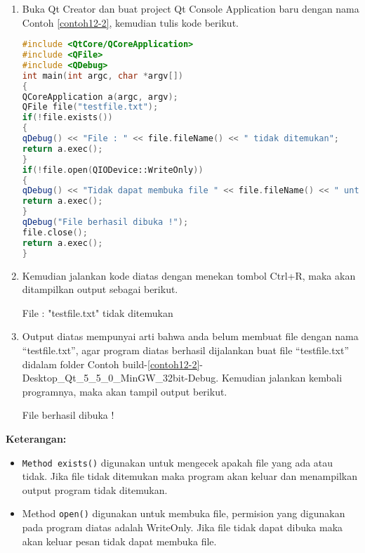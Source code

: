 \begin{enumerate}

\item
  Buka Qt Creator dan buat project Qt Console Application baru dengan
  nama Contoh \ref{contoh12-2}, kemudian tulis kode berikut.

\begin{lstlisting}[language=c++, caption=Memeriksa apakah file ada dan bisa diakses, label=contoh12-2]
#include <QtCore/QCoreApplication>
#include <QFile>
#include <QDebug>
int main(int argc, char *argv[])
{
QCoreApplication a(argc, argv);
QFile file("testfile.txt");
if(!file.exists())
{
qDebug() << "File : " << file.fileName() << " tidak ditemukan";
return a.exec();
}
if(!file.open(QIODevice::WriteOnly))
{
qDebug() << "Tidak dapat membuka file " << file.fileName() << " untuk ditulis";
return a.exec();
}
qDebug("File berhasil dibuka !");
file.close();
return a.exec();
}
\end{lstlisting}
\item
  Kemudian jalankan kode diatas dengan menekan tombol Ctrl+R, maka akan
  ditampilkan output sebagai berikut.
  
  \begin{lcverbatim}
File :  "testfile.txt"  tidak ditemukan
  \end{lcverbatim}
\item
  Output diatas mempunyai arti bahwa anda belum membuat file dengan nama
  ``testfile.txt'', agar program diatas berhasil dijalankan buat file
  ``testfile.txt'' didalam folder Contoh build-\ref{contoh12-2}-Desktop\_Qt\_5\_5\_0\_MinGW\_32bit-Debug.
   Kemudian  jalankan kembali programnya, maka akan tampil output berikut.
  
  \begin{lcverbatim}
  	File berhasil dibuka !
  \end{lcverbatim}
  
\end{enumerate}

\textbf{Keterangan:}

\begin{itemize}

\item
  \texttt{Method\ exists()} digunakan untuk mengecek apakah file yang
  ada atau tidak. Jika file tidak ditemukan maka program akan keluar dan
  menampilkan output program tidak ditemukan.
\item
  Method \texttt{open()} digunakan untuk membuka file, permision yang
  digunakan pada program diatas adalah WriteOnly. Jika file tidak dapat
  dibuka maka akan keluar pesan tidak dapat membuka file.
\end{itemize}

